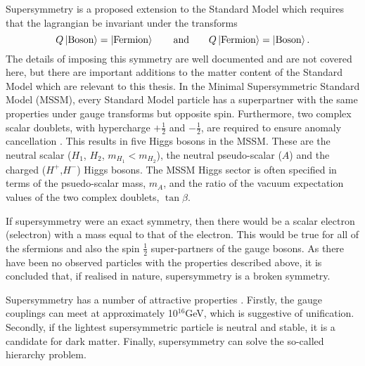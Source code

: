 
Supersymmetry \cite{Martin:1997ns} is a proposed extension to the Standard Model which requires that the lagrangian be invariant under the transforms
\begin{equation}
Q \Ket{\text{Boson}} = \Ket{\text{Fermion}} \qquad \text{and} \qquad Q \Ket{\text{Fermion}} = \Ket{\text{Boson}}.
\end{equation}
The details of imposing this symmetry are well documented \cite{Martin:1997ns} and are not covered here, but there are important additions to the matter content of the Standard Model which are relevant to this thesis. In the Minimal Supersymmetric Standard Model (MSSM), every Standard Model particle has a superpartner with the same properties under gauge transforms but opposite spin. Furthermore, two complex scalar doublets, with hypercharge $+\frac{1}{2}$ and $-\frac{1}{2}$, are required to ensure anomaly cancellation \cite{Martin:1997ns}. This results in five Higgs bosons in the MSSM. These are the neutral scalar ($H_1$, $H_2$, $m_{H_1} < m_{H_2}$), the neutral pseudo-scalar ($A$) and the charged ($H^+$,$H^-$) Higgs bosons. The MSSM Higgs sector is often specified in terms of the psuedo-scalar mass, $m_A$, and the ratio of the vacuum expectation values of the two complex doublets, $\tan \beta$. 

If supersymmetry were an exact symmetry, then there would be a scalar electron (selectron) with a mass equal to that of the electron. This would be true for all of the sfermions and also the spin $\frac{1}{2}$ super-partners of the gauge bosons. As there have been no observed particles with the  properties described above, it is concluded that, if realised in nature, supersymmetry is a broken symmetry.

Supersymmetry has a number of attractive properties \cite{Martin:1997ns,Olive:1999ks}. Firstly, the gauge couplings can meet at approximately 10$^{16}$GeV, which is suggestive of unification. Secondly, if the lightest supersymmetric particle is neutral and stable, it is a candidate for dark matter. Finally, 
supersymmetry can solve the so-called hierarchy problem. 

